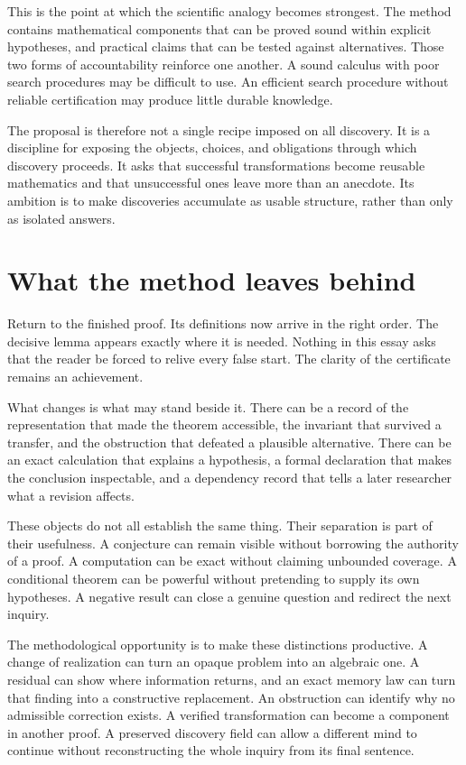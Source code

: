 This is the point at which the scientific analogy becomes strongest. The method contains mathematical components that can be proved sound within explicit hypotheses, and practical claims that can be tested against alternatives. Those two forms of accountability reinforce one another. A sound calculus with poor search procedures may be difficult to use. An efficient search procedure without reliable certification may produce little durable knowledge.

The proposal is therefore not a single recipe imposed on all discovery. It is a discipline for exposing the objects, choices, and obligations through which discovery proceeds. It asks that successful transformations become reusable mathematics and that unsuccessful ones leave more than an anecdote. Its ambition is to make discoveries accumulate as usable structure, rather than only as isolated answers.

\clearpage
{}
\section*{What the method leaves behind}

Return to the finished proof. Its definitions now arrive in the right order. The decisive lemma appears exactly where it is needed. Nothing in this essay asks that the reader be forced to relive every false start. The clarity of the certificate remains an achievement.

What changes is what may stand beside it. There can be a record of the representation that made the theorem accessible, the invariant that survived a transfer, and the obstruction that defeated a plausible alternative. There can be an exact calculation that explains a hypothesis, a formal declaration that makes the conclusion inspectable, and a dependency record that tells a later researcher what a revision affects.

These objects do not all establish the same thing. Their separation is part of their usefulness. A conjecture can remain visible without borrowing the authority of a proof. A computation can be exact without claiming unbounded coverage. A conditional theorem can be powerful without pretending to supply its own hypotheses. A negative result can close a genuine question and redirect the next inquiry.

The methodological opportunity is to make these distinctions productive. A change of realization can turn an opaque problem into an algebraic one. A residual can show where information returns, and an exact memory law can turn that finding into a constructive replacement. An obstruction can identify why no admissible correction exists. A verified transformation can become a component in another proof. A preserved discovery field can allow a different mind to continue without reconstructing the whole inquiry from its final sentence.

